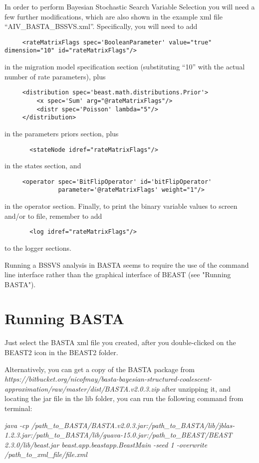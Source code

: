 \documentclass[10pt,letterpaper]{article}
\begin{document}
In order to perform Bayesian Stochastic Search Variable Selection you will need a few further modifications, which are also shown in the example xml file ``AIV\_BASTA\_BSSVS.xml''.
Specifically, you will need to add
\begin{lstlisting}
     <rateMatrixFlags spec='BooleanParameter' value="true" dimension="10" id="rateMatrixFlags"/>
\end{lstlisting}
in the migration model specification section (substituting ``10'' with the actual number of rate parameters), plus
\begin{lstlisting}
     <distribution spec='beast.math.distributions.Prior'>
         <x spec='Sum' arg="@rateMatrixFlags"/>
         <distr spec='Poisson' lambda="5"/>
     </distribution>
\end{lstlisting}
in the parameters priors section,  plus
\begin{lstlisting}
       <stateNode idref="rateMatrixFlags"/>
\end{lstlisting}
in the states section, and 
\begin{lstlisting}
     <operator spec='BitFlipOperator' id='bitFlipOperator'
               parameter='@rateMatrixFlags' weight="1"/>
\end{lstlisting}
in the operator section.
Finally, to print the binary variable values to screen and/or to file, remember to add
\begin{lstlisting}
       <log idref="rateMatrixFlags"/>
\end{lstlisting}
to the logger sections.


Running a BSSVS analysis in BASTA seems to require the use of the command line interface rather than the graphical interface of BEAST (see "Running BASTA").


\section{Running BASTA}

Just select the BASTA xml file you created, after you double-clicked on the BEAST2 icon in the BEAST2 folder.

Alternatively, you can get a copy of the BASTA package from \emph{ https://bitbucket.org/nicofmay/basta-bayesian-structured-coalescent-approximation/raw/master/dist/BASTA.v2.0.3.zip}
after unzipping it, and locating the jar file in the lib folder, you can run the following command from terminal:

\emph{java -cp /path\_to\_BASTA/BASTA.v2.0.3.jar:/path\_to\_BASTA/lib/jblas-1.2.3.jar:/path\_to\_BASTA/lib/guava-15.0.jar:/path\_to\_BEAST/BEAST\\ 2.3.0/lib/beast.jar beast.app.beastapp.BeastMain -seed 1 -overwrite /path\_to\_xml\_file/file.xml}
\end{document}
